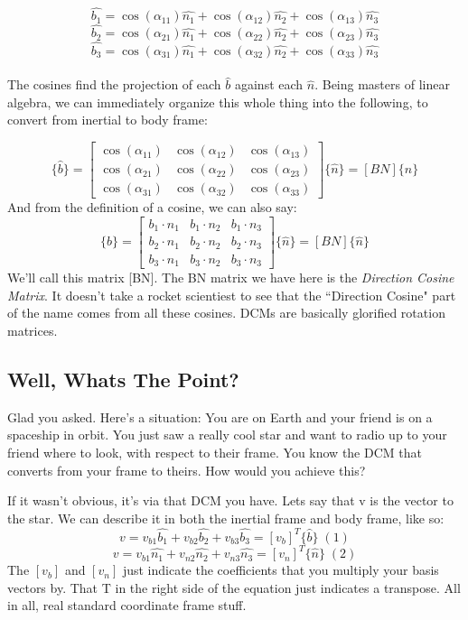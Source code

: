 \documentclass[a4paper,14pt]{extreport}
\newcommand{\bv}[1]{\hat{b_{#1}}}
\newcommand{\nv}[1]{\hat{n_{#1}}}
\begin{document}
\[\bv{1} = \cos(\alpha_{11})\nv{1} + \cos(\alpha_{12})\nv{2} + \cos(\alpha_{13})\nv{3}\]
\[\bv{2} = \cos(\alpha_{21})\nv{1} + \cos(\alpha_{22})\nv{2} + \cos(\alpha_{23})\nv{3}\]
\[\bv{3} = \cos(\alpha_{31})\nv{1} + \cos(\alpha_{32})\nv{2} + \cos(\alpha_{33})\nv{3}\]
\\
The cosines find the projection of each $\hat{b}$ against each $\hat{n}$. Being masters of linear algebra, we can immediately organize this whole thing into the following, to convert from inertial to body frame:

\[
\{\hat{b}\} = \begin{bmatrix}
\cos(\alpha_{11})&\cos(\alpha_{12})&\cos(\alpha_{13}) \\
\cos(\alpha_{21})&\cos(\alpha_{22})&\cos(\alpha_{23}) \\
\cos(\alpha_{31})&\cos(\alpha_{32})&\cos(\alpha_{33})
\end{bmatrix} \{\hat{n}\} = [BN] \{\hat{n}\}
\]
And from the definition of a cosine, we can also say:
\[
\{\hat{b}\} = \begin{bmatrix}
b_1 \cdot n_1 & b_1 \cdot n_2 & b_1 \cdot n_3 \\
b_2 \cdot n_1 & b_2 \cdot n_2 & b_2 \cdot n_3 \\
b_3 \cdot n_1 & b_3 \cdot n_2 & b_3 \cdot n_3
\end{bmatrix} \{\hat{n}\} = [BN] \{\hat{n}\}
\]
We'll call this matrix [BN]. The BN matrix we have here is the \emph{Direction Cosine Matrix}. It doesn't take a rocket scientiest to see that the ``Direction Cosine" part of the name comes from all these cosines. DCMs are basically glorified rotation matrices.
\subsection{Well, Whats The Point?}
Glad you asked. Here's a situation: You are on Earth and your friend is on a spaceship in orbit. You just saw a really cool star and want to radio up to your friend where to look, with respect to their frame. You know the DCM that converts from your frame to theirs. How would you achieve this?

If it wasn't obvious, it's via that DCM you have. Lets say that v is the vector to the star. We can describe it in both the inertial frame and body frame, like so:
\[v = v_{b1}\bv{1}+v_{b2}\bv{2}+v_{b3}\bv{3}=[v_b]^T\{\hat{b}\}\;(1)\]
\[v = v_{b1}\nv{1}+v_{n2}\nv{2}+v_{n3}\nv{3}=[v_n]^T\{\hat{n}\}\;(2)\]
The $[v_b]$ and $[v_n]$ just indicate the coefficients that you multiply your basis vectors by. That T in the right side of the equation just indicates a transpose. All in all, real standard coordinate frame stuff. 
\end{document}
